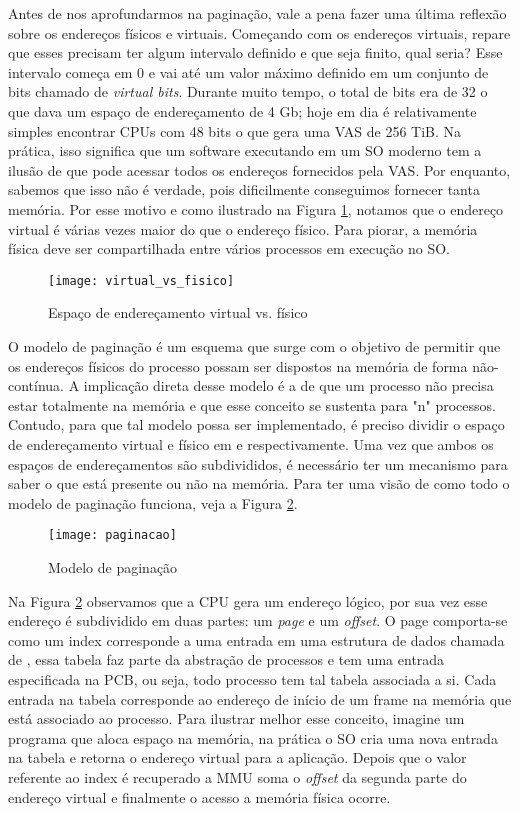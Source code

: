 Antes de nos aprofundarmos na paginação, vale a pena fazer uma última reflexão
sobre os endereços físicos e virtuais. Começando com os endereços virtuais,
repare que esses precisam ter algum intervalo definido e que seja finito, qual
seria? Esse intervalo começa em 0 e vai até um valor máximo definido em um
conjunto de bits chamado de \textit{virtual bits}. Durante muito tempo, o total
de bits era de 32 o que dava um espaço de endereçamento de 4 Gb; hoje em dia é
relativamente simples encontrar CPUs com 48 bits o que gera uma VAS de 256 TiB.
Na prática, isso significa que um software executando em um SO moderno tem a
ilusão de que pode acessar todos os endereços fornecidos pela VAS. Por
enquanto, sabemos que isso não é verdade, pois dificilmente conseguimos
fornecer tanta memória. Por esse motivo e como ilustrado na Figura
\ref{fig:vas_pas}, notamos que o endereço virtual é várias vezes maior do que o
endereço físico. Para piorar, a memória física deve ser compartilhada entre
vários processos em execução no SO.

\begin{figure}[!h]
  \centering
  \texttt{[image: virtual\_vs\_fisico]} 
  \caption{Espaço de endereçamento virtual vs. físico}
  \label{fig:vas_pas}
\end{figure}

O modelo de paginação é um esquema que surge com o objetivo de permitir que os
endereços físicos do processo possam ser dispostos na memória de forma
não-contínua. A implicação direta desse modelo é a de que um processo não
precisa estar totalmente na memória e que esse conceito se sustenta para "n"
processos. Contudo, para que tal modelo possa ser implementado, é preciso
dividir o espaço de endereçamento virtual e físico em  e
 respectivamente. Uma vez que ambos os espaços de endereçamentos
são subdivididos, é necessário ter um mecanismo para saber o que está presente
ou não na memória. Para ter uma visão de como todo o modelo de paginação
funciona, veja a Figura \ref{fig:paginacao}.

\begin{figure}[!h]
  \centering
  \texttt{[image: paginacao]} 
  \caption{Modelo de paginação}
  \label{fig:paginacao}
\end{figure}

Na Figura \ref{fig:paginacao} observamos que a CPU gera um endereço lógico, por
sua vez esse endereço é subdividido em duas partes: um \textit{page} e um
\textit{offset}. O page comporta-se como um index corresponde a uma entrada em
uma estrutura de dados chamada de , essa tabela faz
parte da abstração de processos e tem uma entrada especificada na PCB, ou seja,
todo processo tem tal tabela associada a si. Cada entrada na tabela corresponde
ao endereço de início de um frame na memória que está associado ao processo.
Para ilustrar melhor esse conceito, imagine um programa que aloca espaço na
memória, na prática o SO cria uma nova entrada na tabela e retorna o endereço
virtual para a aplicação.  Depois que o valor referente ao index é recuperado a
MMU soma o \textit{offset} da segunda parte do endereço virtual e finalmente o
acesso a memória física ocorre.

